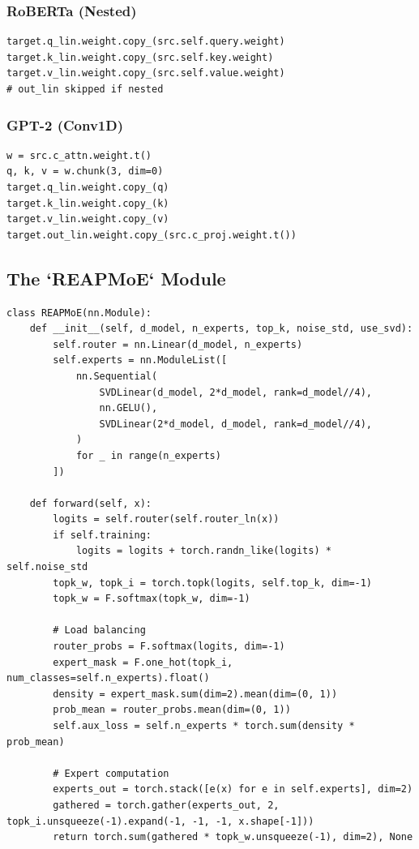 \subsubsection{RoBERTa (Nested)}

\begin{lstlisting}
target.q_lin.weight.copy_(src.self.query.weight)
target.k_lin.weight.copy_(src.self.key.weight)
target.v_lin.weight.copy_(src.self.value.weight)
# out_lin skipped if nested
\end{lstlisting}

\subsubsection{GPT-2 (Conv1D)}

\begin{lstlisting}
w = src.c_attn.weight.t()
q, k, v = w.chunk(3, dim=0)
target.q_lin.weight.copy_(q)
target.k_lin.weight.copy_(k)
target.v_lin.weight.copy_(v)
target.out_lin.weight.copy_(src.c_proj.weight.t())
\end{lstlisting}

\subsection{The `REAPMoE` Module}

\begin{lstlisting}
class REAPMoE(nn.Module):
    def __init__(self, d_model, n_experts, top_k, noise_std, use_svd):
        self.router = nn.Linear(d_model, n_experts)
        self.experts = nn.ModuleList([
            nn.Sequential(
                SVDLinear(d_model, 2*d_model, rank=d_model//4),
                nn.GELU(),
                SVDLinear(2*d_model, d_model, rank=d_model//4),
            )
            for _ in range(n_experts)
        ])
    
    def forward(self, x):
        logits = self.router(self.router_ln(x))
        if self.training:
            logits = logits + torch.randn_like(logits) * self.noise_std
        topk_w, topk_i = torch.topk(logits, self.top_k, dim=-1)
        topk_w = F.softmax(topk_w, dim=-1)
        
        # Load balancing
        router_probs = F.softmax(logits, dim=-1)
        expert_mask = F.one_hot(topk_i, num_classes=self.n_experts).float()
        density = expert_mask.sum(dim=2).mean(dim=(0, 1))
        prob_mean = router_probs.mean(dim=(0, 1))
        self.aux_loss = self.n_experts * torch.sum(density * prob_mean)
        
        # Expert computation
        experts_out = torch.stack([e(x) for e in self.experts], dim=2)
        gathered = torch.gather(experts_out, 2, topk_i.unsqueeze(-1).expand(-1, -1, -1, x.shape[-1]))
        return torch.sum(gathered * topk_w.unsqueeze(-1), dim=2), None
\end{lstlisting}

